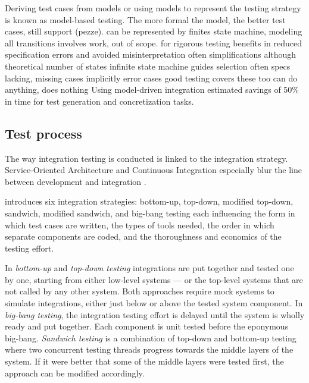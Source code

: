 \documentclass[12pt,a4paper,oneside,pdftex]{report}
\begin{document}
Deriving test cases from models or using models to represent the testing strategy is known as model-based testing.
The more formal the model, the better test cases, still support (pezze). 
can be represented by finites state machine, modeling all transitions involves work, out of scope. for rigorous testing
benefits in reduced specification errors and avoided misinterpretation 
often simplifications although theoretical number of states infinite
state machine guides selection
often specs lacking, missing cases implicitly error cases
good testing covers these too
can do anything, does nothing
Using model-driven integration \citet{wieczorek2010model} estimated savings of 50\% in time for test generation and concretization tasks.


\subsection{Test process}
The way integration testing is conducted is linked to the integration strategy. Service-Oriented Architecture and Continuous Integration especially blur the line between development and integration \citep{huang2008surrogate, wieczorek2010model}. 

\citet{myers1976software} introduces six integration strategies: bottom-up, top-down, modified top-down, sandwich, modified sandwich, and big-bang testing each influencing the form in which test cases are written, the types of tools needed, the order in which separate components are coded, and the thoroughness and economics of the testing effort. 

In \emph{bottom-up} and \emph{top-down testing} integrations are put together and tested one by one, starting from either low-level systems --- or the top-level systems that are not called by any other system. Both approaches require mock systems to simulate integrations, either just below or above the tested system component. In \emph{big-bang testing}, the integration testing effort is delayed until the system is wholly ready and put together. Each component is unit tested before the eponymous big-bang. \emph{Sandwich testing} is a combination of top-down and bottom-up testing where two concurrent testing threads progress towards the middle layers of the system. If it were better that some of the middle layers were tested first, the approach can be modified accordingly. \citep{burnstein2003practical, myers1976software}
\end{document}
